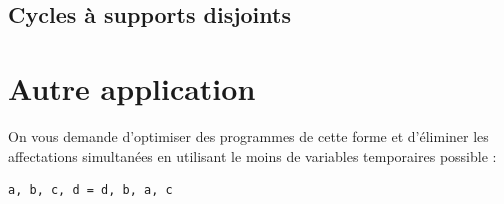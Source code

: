 \documentclass[11pt,a4paper,oneside]{book}
\begin{document}
\subsection{Cycles à supports disjoints}


\section{Autre application} %
On vous demande d'optimiser des programmes de cette forme et d'éliminer les
affectations simultanées en utilisant le moins de variables temporaires
possible :
\begin{verbatim}
a, b, c, d = d, b, a, c
\end{verbatim}
\end{document}

